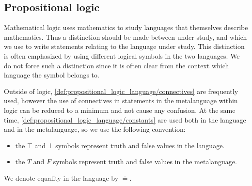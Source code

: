 \subsection{Propositional logic}\label{subsec:propositional_logic}

\begin{remark}\label{remark:metalanguage}
  Mathematical logic uses mathematics to study languages that themselves describe mathematics. Thus a distinction should be made between  under study, and  which we use to write statements relating to the language under study. This distinction is often emphasized by using different logical symbols in the two languages. We do not force such a distinction since it is often clear from the context which language the symbol belongs to.

  Outside of logic, \ref{def:propositional_logic_language/connectives} are frequently used, however the use of connectives in statements in the metalanguage within logic can be reduced to a minimum and not cause any confusion. At the same time, \ref{def:propositional_logic_language/constants} are used both in the language and in the metalanguage, so we use the following convention:
  \begin{itemize}
    \item the \( \top \) and \( \bot \) symbols represent truth and false values in the language.
    \item the \( T \) and \( F \) symbols represent truth and false values in the metalanguage.
  \end{itemize}

  We denote equality in the language by \( \doteq \).
\end{remark}

